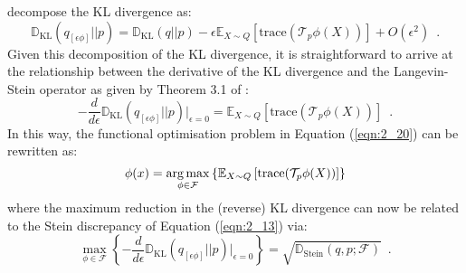\citet{liu_svgd_moment} decompose the KL divergence as:
\begin{equation*}
\mathbb{D}_{\text{KL}}(q_{[\epsilon \phi]}||p) = \mathbb{D}_{\text{KL}}(q||p) - \epsilon \mathbb{E}_{X \sim Q}\left[\mathrm{trace}(\mathcal{T}_p \phi(X))\right] + O(\epsilon^2) \enspace.
\end{equation*}
Given this decomposition of the KL divergence, it is straightforward to arrive at the relationship between the derivative of the KL divergence and the Langevin-Stein operator as given by Theorem 3.1 of \citet{liu_svgd}:
\renewcommand{\theequation}{2.21}
\begin{equation}
- \frac{d}{d \epsilon} \mathbb{D}_{\text{KL}}(q_{[\epsilon \phi]} || p)\big|_{\epsilon=0} = \mathbb{E}_{X \sim Q}\left[\mathrm{trace}\left(\mathcal{T}_p \phi(X) \right)\right] \enspace.
\end{equation}
In this way, the functional optimisation problem in Equation (\ref{eqn:2_20}) can be rewritten as:
\begin{equation*}
\phi(x) = \underset{\phi \in \mathcal{F}}{\operatorname*{arg\,max}} \left \{\mathbb{E}_{X \sim Q} \left[\mathrm{trace}(\mathcal{T}_p \phi(X))\right] \right\} 
\end{equation*}
where the maximum reduction in the (reverse) KL divergence can now be related to the Stein discrepancy of Equation (\ref{eqn:2_13}) via:
\begin{equation*}
\underset{\phi \in \mathcal{F}}{\max} \left \{- \frac{d}{d \epsilon} \mathbb{D}_{\text{KL}}(q_{[\epsilon \phi]} || p) \big|_{\epsilon=0} \right \} = \sqrt{\mathbb{D}_{\text{Stein}}(q, p; \mathcal{F})} \enspace.
\end{equation*}

